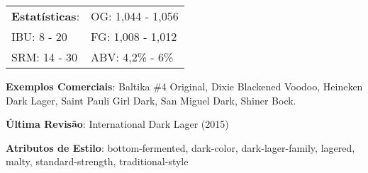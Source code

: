 \begin{tabular}{@{}p{35mm}p{35mm}@{}}
  \textbf{Estatísticas}: & OG: 1,044 - 1,056 \\
  IBU: 8 - 20 & FG: 1,008 - 1,012 \\
  SRM: 14 - 30 & ABV: 4,2\% - 6\%
  \end{tabular}

\textbf{Exemplos Comerciais}: Baltika \#4 Original, Dixie Blackened Voodoo, Heineken Dark Lager, Saint Pauli Girl Dark, San Miguel Dark, Shiner Bock.

\textbf{Última Revisão}: International Dark Lager (2015)

\textbf{Atributos de Estilo}: bottom-fermented, dark-color, dark-lager-family, lagered, malty, standard-strength, traditional-style